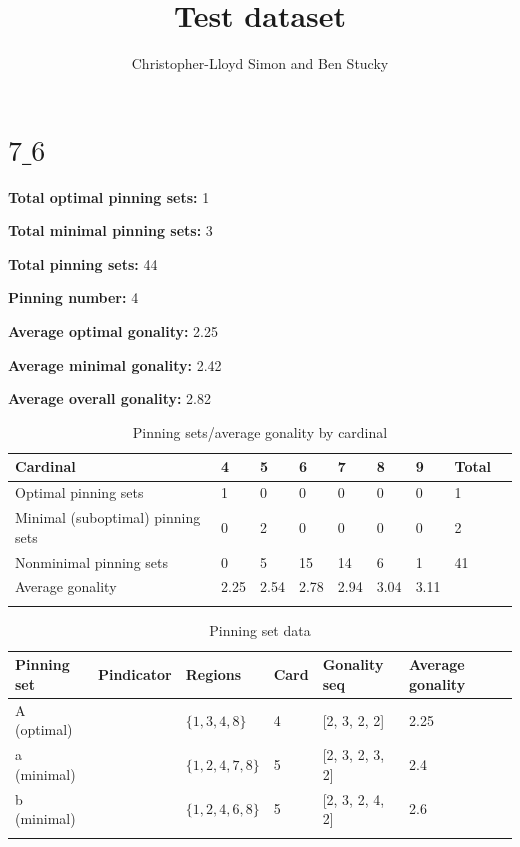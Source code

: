 \documentclass{article}%
\title{Test dataset}
\author{Christopher-Lloyd Simon and Ben Stucky}
\begin{document}
%
\maketitle
\small

\section{$7\_6$}

\begin{multicols}{2}
{\normalsize \noindent\textbf{Total optimal pinning sets:} 1

\noindent\textbf{Total minimal pinning sets:} 3

\noindent\textbf{Total pinning sets:} 44

\noindent\textbf{Pinning number:} 4

}
\columnbreak

{\normalsize \noindent\textbf{Average optimal gonality:} 2.25

\noindent\textbf{Average minimal gonality:} 2.42

\noindent\textbf{Average overall gonality:} 2.82

}
\end{multicols}

\begin{table}[ht]
	\caption{Pinning sets/average gonality by cardinal}
	\centering
	\renewcommand{\arraystretch}{1.5}
	\begin{tabularx}{\textwidth}{lXXXXXXXX}
		\toprule
			Cardinal & 4 & 5 & 6 & 7 & 8 & 9 & Total\\
			\hline
			Optimal pinning sets & 1 & 0 & 0 & 0 & 0 & 0 & 1 \\
			Minimal (suboptimal) pinning sets & 0 & 2 & 0 & 0 & 0 & 0 & 2 \\
			Nonminimal pinning sets & 0 & 5 & 15 & 14 & 6 & 1 & 41 \\
			Average gonality & 2.25 & 2.54 & 2.78 & 2.94 & 3.04 & 3.11 &  \\
		\bottomrule \\ 
	\end{tabularx}
\end{table}

\begin{table}[ht]
	\caption{Pinning set data}
	\centering
	\renewcommand{\arraystretch}{1.5}
	\begin{tabularx}{\textwidth}{lXXXXXX}
		\toprule
			Pinning set & Pindicator & Regions & Card & Gonality seq & Average gonality\\
			\hline
			A (optimal) & {\Huge\textcolor{red0}{\textbullet}} & $\{1,3,4,8\}$ & 4 & [2, 3, 2, 2] & 2.25 \\
			a (minimal) & {\Huge\textcolor{green0}{\textbullet}} & $\{1,2,4,7,8\}$ & 5 & [2, 3, 2, 3, 2] & 2.4 \\
			b (minimal) & {\Huge\textcolor{green5}{\textbullet}} & $\{1,2,4,6,8\}$ & 5 & [2, 3, 2, 4, 2] & 2.6 \\
		\bottomrule \\ 
	\end{tabularx}
\end{table}
\end{document}
